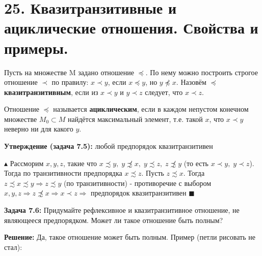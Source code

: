 \section*{25. Квазитранзитивные и ациклические отношения. Свойства и примеры.}
\par Пусть на множестве M задано отношение $\preccurlyeq$. По нему можно построить строгое отношение $\prec$ по правилу: $x \prec y$, если $x \preccurlyeq y$, но $y \not\preccurlyeq x$. Назовём $\preccurlyeq$ \textbf{квазитранзитивным}, если из $x \prec y$ и $y \prec z$ следует, что $x \prec z$.
\par Отношение $\preccurlyeq$ называется \textbf{ациклическим}, если в каждом непустом конечном множестве $M_0 \subset M$ найдётся максимальный элемент, т.е. такой $x$, что $x \prec y$ неверно ни для какого $y$.

\par \textbf{Утверждение (задача 7.5):} любой предпорядок квазитранзитивен
\par $\blacktriangle$ Рассморим $x, y, z$, такие что $x \precsim y, \; y \not\precsim x, \; y \precsim z, \; z \not\precsim y$ (то есть $x \prec y, \; y \prec z$). Тогда по транзитивности предпорядка $x \precsim z$. Пусть $z \precsim x$. Тогда $z \precsim x \precsim y \Rightarrow z \precsim y$ (по транзитивности) - противоречие с выбором $x, y, z \Rightarrow z \not\precsim x \Rightarrow x \prec z \Rightarrow$ предпорядок квазитранзитивен $\blacksquare$

\par \textbf{Задача 7.6:} Придумайте рефлексивное и квазитранзитивное отношение, не являющееся предпорядком. Может ли такое отношение быть полным?
\par \textbf{Решение:} Да, такое отношение может быть полным. Пример (петли рисовать не стал):

\begin{figure}[h]
\end{figure}

